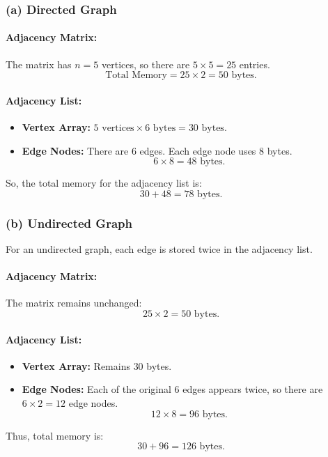 \documentclass[11pt]{article}
\begin{document}
\subsubsection*{(a) Directed Graph}

\paragraph{Adjacency Matrix:}
The matrix has \(n=5\) vertices, so there are \(5 \times 5 = 25\) entries.
\[
    \text{Total Memory} = 25 \times 2 = 50 \text{ bytes.}
\]

\paragraph{Adjacency List:}
\begin{itemize}
    \item \textbf{Vertex Array:} \(5 \text{ vertices} \times 6 \text{ bytes} = 30 \text{ bytes}.\)
    \item \textbf{Edge Nodes:} There are 6 edges. Each edge node uses 8 bytes.
          \[
              6 \times 8 = 48 \text{ bytes.}
          \]
\end{itemize}
So, the total memory for the adjacency list is:
\[
    30 + 48 = 78 \text{ bytes.}
\]

\subsubsection*{(b) Undirected Graph}

For an undirected graph, each edge is stored twice in the adjacency list.

\paragraph{Adjacency Matrix:}
The matrix remains unchanged:
\[
    25 \times 2 = 50 \text{ bytes.}
\]

\paragraph{Adjacency List:}
\begin{itemize}
    \item \textbf{Vertex Array:} Remains \(30\) bytes.
    \item \textbf{Edge Nodes:} Each of the original 6 edges appears twice, so there are \(6 \times 2 = 12\) edge nodes.
          \[
              12 \times 8 = 96 \text{ bytes.}
          \]
\end{itemize}
Thus, total memory is:
\[
    30 + 96 = 126 \text{ bytes.}
\]
\end{document}
